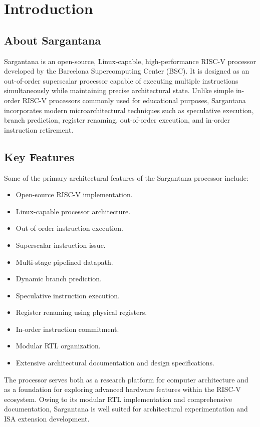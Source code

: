 \chapter{Introduction}

\section{About Sargantana}

Sargantana is an open-source, Linux-capable, high-performance RISC-V processor developed
by the Barcelona Supercomputing Center (BSC). It is designed as an out-of-order superscalar
processor capable of executing multiple instructions simultaneously while maintaining precise
architectural state. Unlike simple in-order RISC-V processors commonly used for educational
purposes, Sargantana incorporates modern microarchitectural techniques such as speculative
execution, branch prediction, register renaming, out-of-order execution, and in-order instruction
retirement.

\section{Key Features}

Some of the primary architectural features of the Sargantana processor include:

\begin{itemize}
  \item Open-source RISC-V implementation.
  \item Linux-capable processor architecture.
  \item Out-of-order instruction execution.
  \item Superscalar instruction issue.
  \item Multi-stage pipelined datapath.
  \item Dynamic branch prediction.
  \item Speculative instruction execution.
  \item Register renaming using physical registers.
  \item In-order instruction commitment.
  \item Modular RTL organization.
  \item Extensive architectural documentation and design specifications.
\end{itemize}

The processor serves both as a research platform for computer architecture and as a foundation
for exploring advanced hardware features within the RISC-V ecosystem. Owing to its modular
RTL implementation and comprehensive documentation, Sargantana is well suited for
architectural experimentation and ISA extension development.

